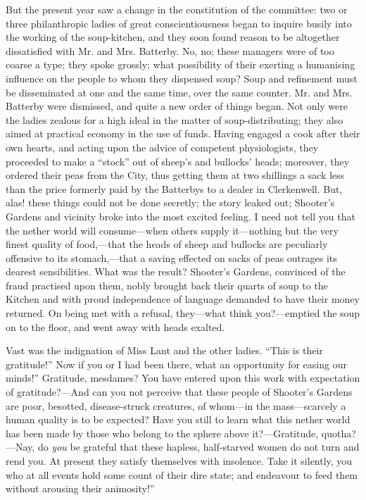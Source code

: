 But the present year saw a change in the constitution of the committee:
two or three philanthropic ladies of great conscientiousness began to
inquire busily into the working of the soup-kitchen, and they soon found
reason to be altogether dissatisfied with Mr. and Mrs. Batterby. No, no;
these managers were of too coarse a type; they spoke grossly; what
possibility of their exerting a humanising {}influence on the people to
whom they dispensed soup? Soup and refinement must be disseminated at
one and the same time, over the same counter. Mr. and Mrs. Batterby were
dismissed, and quite a new order of things began. Not only were the
ladies zealous for a high ideal in the matter of soup-distributing; they
also aimed at practical economy in the use of funds. Having engaged a
cook after their own hearts, and acting upon the advice of competent
physiologists, they proceeded to make a ``stock'' out of sheep's and
bullocks' heads; moreover, they ordered their peas from the City, thus
getting them at two shillings a sack less than the price formerly paid
by the Batterbys to a dealer in Clerkenwell. But, alas! these things
could not be done secretly; the story leaked out; Shooter's Gardens and
vicinity broke into the most excited feeling. I need not tell you that
the nether world will consume---when others supply it---nothing but the
very finest quality of food,---that the heads of sheep and bullocks are
peculiarly offensive to its stomach,---that a saving effected on sacks
of peas outrages its dearest sensibilities. What was the result?
Shooter's Gardens, convinced {}of the fraud practised upon them, nobly
brought back their quarts of soup to the Kitchen and with proud
independence of language demanded to have their money returned. On being
met with a refusal, they---what think you?---emptied the soup on to the
floor, and went away with heads exalted.

Vast was the indignation of Miss Lant and the other ladies. ``This is
their gratitude!'' Now if you or I had been there, what an opportunity
for easing our minds!'' Gratitude, mesdames? You have entered upon this
work with expectation of gratitude?---And can you not perceive that
these people of Shooter's Gardens are poor, besotted, disease-struck
creatures, of whom---in the mass---scarcely a human quality is to be
expected? Have you still to learn what this nether world has been made
by those who belong to the sphere above it?---Gratitude, quotha?---Nay,
do \emph{you} be grateful that these hapless, half-starved women do not
turn and rend you. At present they satisfy themselves with insolence.
Take it silently, you who at all events hold some count of their dire
state; and endeavour to feed them without arousing their animosity!''

